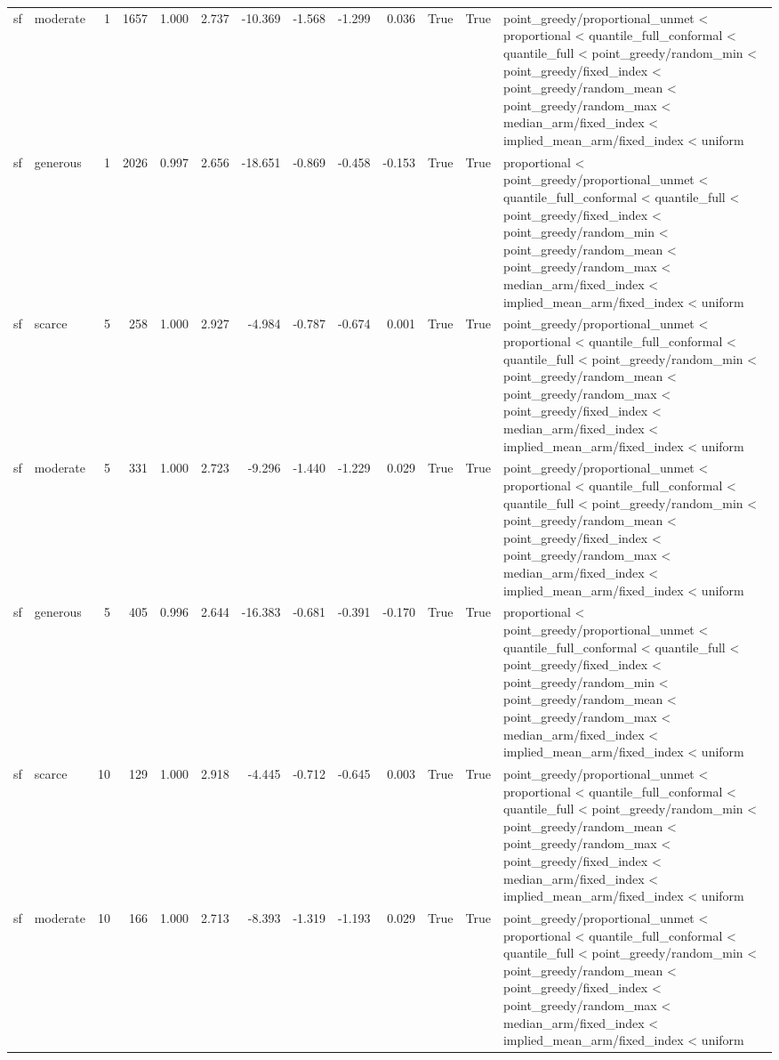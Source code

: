 \begin{tabular}{llrrrrrrrrrrl}
sf & moderate & 1 & 1657 & 1.000 & 2.737 & -10.369 & -1.568 & -1.299 & 0.036 & True & True & point\_greedy/proportional\_unmet < proportional < quantile\_full\_conformal < quantile\_full < point\_greedy/random\_min < point\_greedy/fixed\_index < point\_greedy/random\_mean < point\_greedy/random\_max < median\_arm/fixed\_index < implied\_mean\_arm/fixed\_index < uniform \\
sf & generous & 1 & 2026 & 0.997 & 2.656 & -18.651 & -0.869 & -0.458 & -0.153 & True & True & proportional < point\_greedy/proportional\_unmet < quantile\_full\_conformal < quantile\_full < point\_greedy/fixed\_index < point\_greedy/random\_min < point\_greedy/random\_mean < point\_greedy/random\_max < median\_arm/fixed\_index < implied\_mean\_arm/fixed\_index < uniform \\
sf & scarce & 5 & 258 & 1.000 & 2.927 & -4.984 & -0.787 & -0.674 & 0.001 & True & True & point\_greedy/proportional\_unmet < proportional < quantile\_full\_conformal < quantile\_full < point\_greedy/random\_min < point\_greedy/random\_mean < point\_greedy/random\_max < point\_greedy/fixed\_index < median\_arm/fixed\_index < implied\_mean\_arm/fixed\_index < uniform \\
sf & moderate & 5 & 331 & 1.000 & 2.723 & -9.296 & -1.440 & -1.229 & 0.029 & True & True & point\_greedy/proportional\_unmet < proportional < quantile\_full\_conformal < quantile\_full < point\_greedy/random\_min < point\_greedy/random\_mean < point\_greedy/fixed\_index < point\_greedy/random\_max < median\_arm/fixed\_index < implied\_mean\_arm/fixed\_index < uniform \\
sf & generous & 5 & 405 & 0.996 & 2.644 & -16.383 & -0.681 & -0.391 & -0.170 & True & True & proportional < point\_greedy/proportional\_unmet < quantile\_full\_conformal < quantile\_full < point\_greedy/fixed\_index < point\_greedy/random\_min < point\_greedy/random\_mean < point\_greedy/random\_max < median\_arm/fixed\_index < implied\_mean\_arm/fixed\_index < uniform \\
sf & scarce & 10 & 129 & 1.000 & 2.918 & -4.445 & -0.712 & -0.645 & 0.003 & True & True & point\_greedy/proportional\_unmet < proportional < quantile\_full\_conformal < quantile\_full < point\_greedy/random\_min < point\_greedy/random\_mean < point\_greedy/random\_max < point\_greedy/fixed\_index < median\_arm/fixed\_index < implied\_mean\_arm/fixed\_index < uniform \\
sf & moderate & 10 & 166 & 1.000 & 2.713 & -8.393 & -1.319 & -1.193 & 0.029 & True & True & point\_greedy/proportional\_unmet < proportional < quantile\_full\_conformal < quantile\_full < point\_greedy/random\_min < point\_greedy/random\_mean < point\_greedy/fixed\_index < point\_greedy/random\_max < median\_arm/fixed\_index < implied\_mean\_arm/fixed\_index < uniform \\

\end{tabular}
